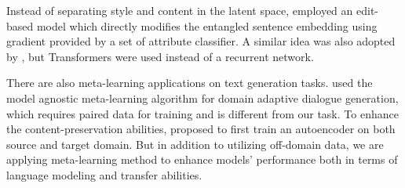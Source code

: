 Instead of separating style and content in the latent space, \citet{Liu2019} employed an edit-based model which directly modifies the entangled sentence embedding using gradient provided by a set of attribute classifier. A similar idea was also adopted by \citet{wang2019}, but Transformers were used instead of a recurrent network.

There are also meta-learning applications on text generation tasks. \citet{qian2019domain} used the model agnostic meta-learning algorithm for domain adaptive dialogue generation, which requires paired data for training and is different from our task. To enhance the content-preservation abilities, \citet{li2019domain} proposed to first train an autoencoder on both source and target domain. But in addition to utilizing off-domain data, we are applying meta-learning method to enhance models' performance both in terms of language modeling and transfer abilities.

